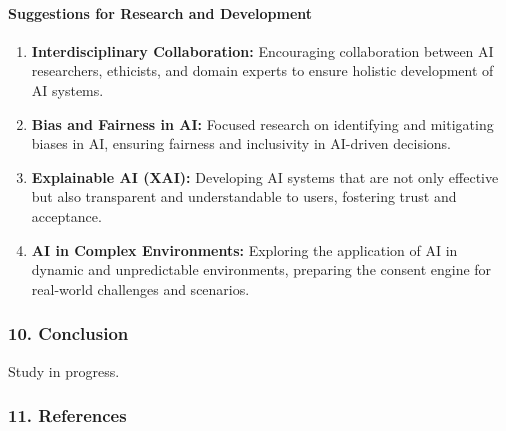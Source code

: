 \hypertarget{suggestions-for-research-and-development}{%
\paragraph{Suggestions for Research and
Development}\label{suggestions-for-research-and-development}}

\begin{enumerate}
\def\labelenumi{\arabic{enumi}.}
\item
  \textbf{Interdisciplinary Collaboration:} Encouraging collaboration
  between AI researchers, ethicists, and domain experts to ensure
  holistic development of AI systems.
\item
  \textbf{Bias and Fairness in AI:} Focused research on identifying and
  mitigating biases in AI, ensuring fairness and inclusivity in
  AI-driven decisions.
\item
  \textbf{Explainable AI (XAI):} Developing AI systems that are not only
  effective but also transparent and understandable to users, fostering
  trust and acceptance.
\item
  \textbf{AI in Complex Environments:} Exploring the application of AI
  in dynamic and unpredictable environments, preparing the consent
  engine for real-world challenges and scenarios.
\end{enumerate}

\hypertarget{conclusion}{%
\subsubsection{10. Conclusion}\label{conclusion}}

Study in progress.

\hypertarget{references}{%
\subsubsection{11. References}\label{references}}

